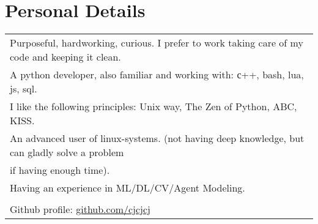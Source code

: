 \documentclass[a4paper,10pt]{article}
\begin{document}
\section{Personal Details}
\begin{tabularx}{\textwidth}{l} %
Purposeful, hardworking, curious. I prefer to work taking care of my code and keeping it clean.\\
A python developer, also familiar and working with: с++, bash, lua, js, sql.\\
I like the following principles: Unix way, The Zen of Python, ABC, KISS.\\
An advanced user of linux-systems. (not having deep knowledge, but can gladly solve a problem \\if having enough time).\\
Having an experience in ML/DL/CV/Agent Modeling.\\
\\
Github profile: \href{https://github.com/cjcjcj}{github.com/cjcjcj} 
\end{tabularx}
\end{document}
